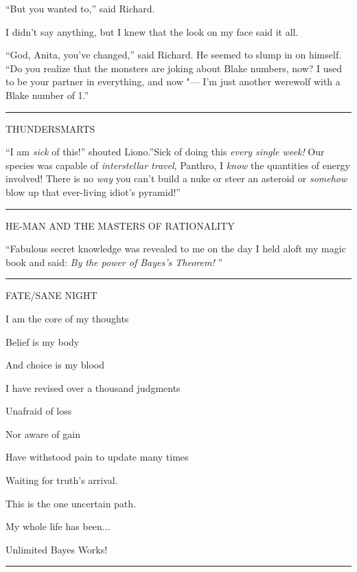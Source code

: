 ``But you wanted to,'' said Richard.

I didn't say anything, but I knew that the look on my face said it all.

``God, Anita, you've changed,'' said Richard. He seemed to slump in on
himself. ``Do you realize that the monsters are joking about Blake
numbers, now? I used to be your partner in everything, and now "--- I'm
just another werewolf with a Blake number of 1.''

\begin{center}\rule{3in}{0.4pt}\end{center}

THUNDERSMARTS

``I am \emph{sick} of this!'' shouted Liono.''Sick of doing this
\emph{every single week!} Our species was capable of \emph{interstellar
travel}, Panthro, I \emph{know} the quantities of energy involved! There
is no \emph{way} you can't build a nuke or steer an asteroid or
\emph{somehow} blow up that ever-living idiot's pyramid!''

\begin{center}\rule{3in}{0.4pt}\end{center}

HE-MAN AND THE MASTERS OF RATIONALITY

``Fabulous secret knowledge was revealed to me on the day I held aloft my
magic book and said: \emph{By the power of Bayes's Theorem!} ''

\begin{center}\rule{3in}{0.4pt}\end{center}

FATE/SANE NIGHT

I am the core of my thoughts

Belief is my body

And choice is my blood

I have revised over a thousand judgments

Unafraid of loss

Nor aware of gain

Have withstood pain to update many times

Waiting for truth's arrival.

This is the one uncertain path.

My whole life has been...

Unlimited Bayes Works!

\begin{center}\rule{3in}{0.4pt}\end{center}

